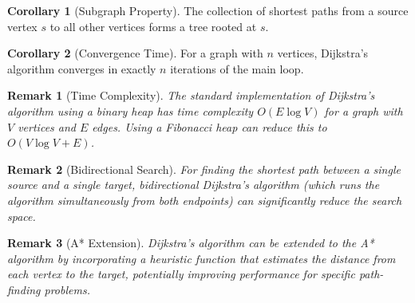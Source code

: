 \documentclass{article}
\newtheorem{remark}{Remark}
\theoremstyle{definition}
\newtheorem{corollary}{Corollary}
\begin{document}
\begin{corollary}[Subgraph Property]
The collection of shortest paths from a source vertex $s$ to all other vertices forms a tree rooted at $s$.
\end{corollary}

\begin{corollary}[Convergence Time]
For a graph with $n$ vertices, Dijkstra's algorithm converges in exactly $n$ iterations of the main loop.
\end{corollary}

\begin{remark}[Time Complexity]
The standard implementation of Dijkstra's algorithm using a binary heap has time complexity $O(E \log V)$ for a graph with $V$ vertices and $E$ edges. Using a Fibonacci heap can reduce this to $O(V \log V + E)$.
\end{remark}

\begin{remark}[Bidirectional Search]
For finding the shortest path between a single source and a single target, bidirectional Dijkstra's algorithm (which runs the algorithm simultaneously from both endpoints) can significantly reduce the search space.
\end{remark}

\begin{remark}[A* Extension]
Dijkstra's algorithm can be extended to the A* algorithm by incorporating a heuristic function that estimates the distance from each vertex to the target, potentially improving performance for specific path-finding problems.
\end{remark}
\end{document}
